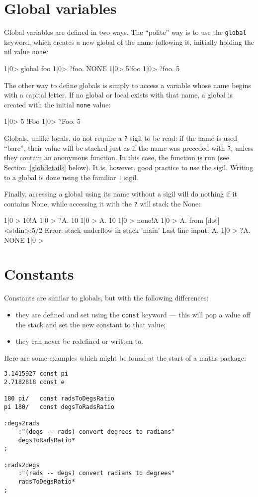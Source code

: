 \section{Global variables}
Global variables are defined in two ways. The ``polite'' way is to use the 
\texttt{global} keyword, which creates a new global of the name following
it, initially holding the nil value \texttt{none}:
\begin{v}
1|0> global foo
1|0> ?foo.
NONE
1|0> 5!foo
1|0> ?foo.
5
\end{v}
The other way to define globals is simply to access a variable whose
name begins with a capital letter. If no global or local exists with that
name, a global is created with the initial \texttt{none} value:
\begin{v}
1|0> 5 !Foo
1|0> ?Foo.
5
\end{v}
Globals, unlike locals, do not require a \texttt{?} sigil to be read:
if the name is used ``bare'', their value will be stacked just as if the name
was preceded with \texttt{?}, unless they contain
an anonymous function. In this case, the function is run (see
Section~\ref{globdetails} below). It is, however, good practice to use
the sigil. Writing to a global is done using the familiar \texttt{!} sigil.

Finally, accessing a global using its name without a sigil
will do nothing if it contains None,
while accessing it with the \texttt{?} will stack the None:
\begin{v}
1|0 > 10!A
1|0 > ?A.
10
1|0 > A.
10
1|0 > none!A
1|0 > A.
  from [dot] <stdin>:5/2
Error: stack underflow in stack 'main'
Last line input: A.
1|0 > ?A.
NONE
1|0 > 
\end{v}


\section{Constants}
Constants are similar to globals, but with the following differences:
\begin{itemize}
\item they are defined and set using the \texttt{const} keyword ---
this will pop a value off the stack and set the new constant to that value;
\item they can never be redefined or written to.
\end{itemize}
Here are some examples which might be found at the start of a maths
package:
\begin{lstlisting}
3.1415927 const pi
2.7182818 const e

180 pi/   const radsToDegsRatio
pi 180/   const degsToRadsRatio

:degs2rads
    :"(degs -- rads) convert degrees to radians"
    degsToRadsRatio*
;

:rads2degs
    :"(rads -- degs) convert radians to degrees"
    radsToDegsRatio*
;
\end{lstlisting}
